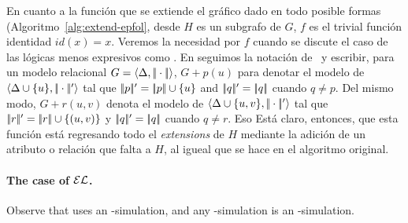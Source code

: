 

En cuanto a la funci\'on que se extiende el gr\'afico dado en todo posible
formas (Algoritmo~\ref{alg:extend-epfol}, desde $ H $
  es un subgrafo de $G$, $f$ es el
trivial funci\'on identidad $\mathit{id(x)} = x$. Veremos la necesidad
por $ f $ cuando se discute el caso de las l\'ogicas menos expresivos como \EL.
En  seguimos la notaci\'on
de~\cite{Krahmer2003} y escribir, para un modelo relacional
$G = \langle \Delta,
|\!|\cdot|\!| \rangle$,  $G + p(u)$ para denotar el modelo de $\langle \Delta
\cup \{u\},|\!|\cdot|\!|' \rangle$ tal que $|\!|p|\!|' = |\!|p|\!|
\cup \{u\}$ and $|\!|q|\!|' = |\!|q|\!|$ cuando  $q \neq p$.
Del mismo modo, $G + r(u,v)$ denota el modelo de $\langle \Delta \cup
\{u,v\},|\!|\cdot|\!|' \rangle$ tal que $|\!|r|\!|' = |\!|r|\!|
\cup \{(u,v)\}$ y $|\!|q|\!|' = |\!|q|\!|$ cuando $q \neq r$. Eso
Est\'a claro, entonces, que esta funci\'on est\'a regresando todo el
\emph{extensions} de $H$ mediante la adici\'on de un atributo o relaci\'on que falta
a $H$, al igueal que se hace en el algoritmo original.

\paragraph{The case of $\mathcal{EL}$.}
Observe that  uses an \EL-simulation, and any
\EPFOL-simulation is an \EL-simulation.
%

